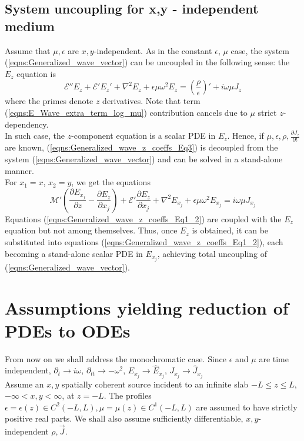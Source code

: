 \documentclass[twocolumn,secnumarabic,amssymb, nobibnotes, aps, prd]{revtex4-1}
\begin{document}
\subsection{System uncoupling for x,y - independent medium}
Assume that $\mu, \epsilon$ are $x,y$-independent. As in the constant $\epsilon$, $\mu$ case, the system (\ref{eqns:Generalized_wave_vector}) can be uncoupled in the following sense: the $E_z$  equation is
\begin{equation}
\mathcal{E}''{E_z} +\mathcal{E}' E_z' + \nabla^2 {E_z} +\epsilon  \mu \omega^2 E_z = \left( \frac{\rho}{\epsilon}\right)' + i \omega \mu J_z
\label{eqns:Generalized_wave_z_coeffs_Eq3}
\end{equation}
where the primes denote $z$ derivatives. Note that term (\ref{eqns:E_Wave_extra_term_log_mu}) contribution cancels due to $\mu$ strict $z$-dependency. \\ In such case, the $z$-component equation is a scalar PDE in $E_z$. Hence, if $\mu, \epsilon,\rho,\frac{\partial J_z}{\partial t}$ are known, (\ref{eqns:Generalized_wave_z_coeffs_Eq3}) is decoupled from the system (\ref{eqns:Generalized_wave_vector}) and can be solved in a stand-alone manner.\\ 
For $x_1=x$, $x_2=y$, we get the  equations  
\begin{equation}
\mathcal{M}'\left( \frac{\partial E_{x_j}}{\partial z} - \frac{\partial E_z}{\partial {x_j}}\right)+\mathcal{E}'\frac{\partial E_z}{\partial {x_j}}+\nabla^2 E_{x_j} +\epsilon \mu \omega^2 E_{x_j} = i \omega \mu J_{x_j}
\label{eqns:Generalized_wave_z_coeffs_Eq1_2}
\end{equation}
Equations (\ref{eqns:Generalized_wave_z_coeffs_Eq1_2}) are coupled with the $E_z$ equation but not among themselves. Thus, once $E_z$ is obtained, it can be substituted into equations  (\ref{eqns:Generalized_wave_z_coeffs_Eq1_2}), each becoming a stand-alone scalar PDE in $E_{x_j}$, achieving total uncoupling of (\ref{eqns:Generalized_wave_vector}).

\section{Assumptions yielding reduction of PDEs to ODEs}
From now on we shall address the monochromatic case. Since $\epsilon$ and $\mu$ are time independent, $\partial_t \rightarrow i \omega$, $\partial_{tt} \rightarrow -\omega^2$, $E_{x_j} \rightarrow \hat{E}_{x_j}$, $J_{x_j} \rightarrow \hat{J}_{x_j}$\\
Assume an $x,y$ spatially coherent source incident to an infinite slab $-L \leq z \leq L$, $-\infty <x,y<\infty$, at $z=-L$. The profiles $\epsilon = \epsilon(z) \in C^{2}(-L,L), \mu=\mu(z)\in C^1(-L,L)$ are assumed to have strictly positive real parts. We shall also assume sufficiently differentiable, $x,y$-independent $\rho, \overrightarrow{J}$.\\
\end{document}
